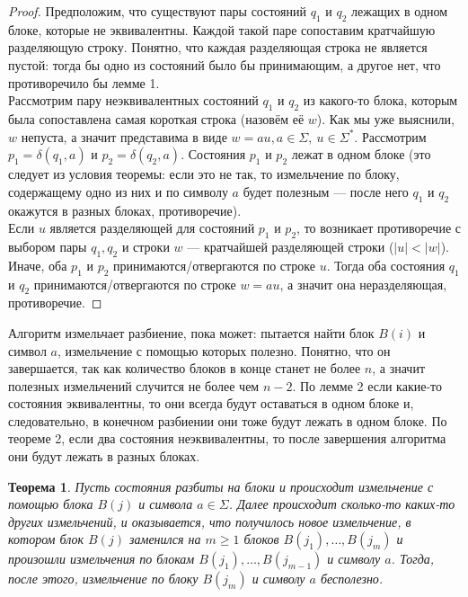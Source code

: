\documentclass{article}
\newtheorem{theorem}{Теорема}
\begin{document}
\begin{proof}
Предположим, что существуют пары состояний $q_1$ и $q_2$ лежащих в одном блоке, которые не эквивалентны. Каждой такой паре сопоставим кратчайшую разделяющую строку. Понятно, что каждая разделяющая строка не является пустой: тогда бы одно из состояний было бы принимающим, а другое нет, что противоречило бы лемме 1.\\
Рассмотрим пару неэквивалентных состояний $q_1$ и $q_2$ из какого-то блока, которым была сопоставлена самая короткая строка (назовём её $w$). Как мы уже выяснили, $w$ непуста, а значит представима в виде $w = au, a \in \Sigma, \ u \in \Sigma^*$. Рассмотрим $p_1 = \delta(q_1, a)$ и $p_2 = \delta(q_2, a)$. Состояния $p_1$ и $p_2$ лежат в одном блоке (это следует из условия теоремы: если это не так, то измельчение по блоку, содержащему одно из них и по символу $a$ будет полезным --- после него $q_1$ и $q_2$ окажутся в разных блоках, противоречие).\\
Если $u$ является разделяющей для состояний $p_1$ и $p_2$, то возникает противоречие с выбором пары $q_1, q_2$ и строки $w$ --- кратчайшей разделяющей строки ($|u| < |w|$). Иначе, оба $p_1$ и $p_2$ принимаются/отвергаются по строке $u$. Тогда оба состояния $q_1$ и $q_2$ принимаются/отвергаются по строке $w=au$, а значит она неразделяющая, противоречие.
\end{proof}
Алгоритм измельчает разбиение, пока может: пытается найти блок $B(i)$ и символ $a$, измельчение с помощью которых полезно. Понятно, что он завершается, так как количество блоков в конце станет не более $n$, а значит полезных измельчений случится не более чем $n - 2$. По лемме 2 если какие-то состояния эквивалентны, то они всегда будут оставаться в одном блоке и, следовательно, в конечном разбиении они тоже будут лежать в одном блоке. По теореме 2, если два состояния неэквивалентны, то после завершения алгоритма они будут лежать в разных блоках. 
\begin{theorem}
    Пусть состояния разбиты на блоки и происходит измельчение с помощью блока $B(j)$ и символа $a \in \Sigma$. Далее происходит сколько-то каких-то других измельчений, и оказывается, что получилось новое измельчение, в котором блок $B(j)$ заменился на $m \ge 1$ блоков $B(j_1), \dots, B(j_m)$ и произошли измельчения по блокам $B(j_1), \dots , B(j_{m - 1})$ и символу $a$. Тогда, после этого, измельчение по блоку $B(j_m)$ и символу $a$ бесполезно.
\end{theorem}
\end{document}
